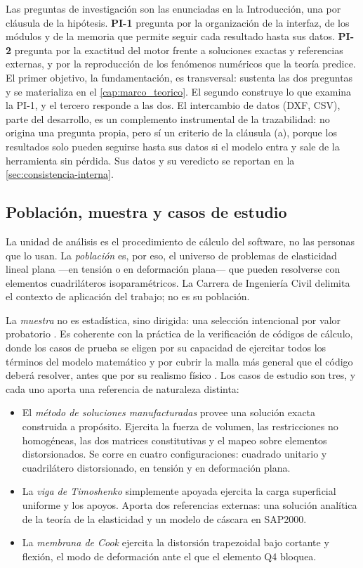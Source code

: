 Las preguntas de investigación son las enunciadas en la Introducción, una por cláusula de la hipótesis. \textbf{PI-1} pregunta por la organización de la interfaz, de los módulos y de la memoria que permite seguir cada resultado hasta sus datos. \textbf{PI-2} pregunta por la exactitud del motor frente a soluciones exactas y referencias externas, y por la reproducción de los fenómenos numéricos que la teoría predice. El primer objetivo, la fundamentación, es transversal: sustenta las dos preguntas y se materializa en el \autoref{cap:marco_teorico}. El segundo construye lo que examina la PI-1, y el tercero responde a las dos. El intercambio de datos (DXF, CSV), parte del desarrollo, es un complemento instrumental de la trazabilidad: no origina una pregunta propia, pero sí un criterio de la cláusula (a), porque los resultados solo pueden seguirse hasta sus datos si el modelo entra y sale de la herramienta sin pérdida. Sus datos y su veredicto se reportan en la \autoref{sec:consistencia-interna}.

\subsection{Población, muestra y casos de estudio}
\label{sec:poblacion}

La unidad de análisis es el procedimiento de cálculo del software, no las personas que lo usan. La \emph{población} es, por eso, el universo de problemas de elasticidad lineal plana —en tensión o en deformación plana— que pueden resolverse con elementos cuadriláteros isoparamétricos. La Carrera de Ingeniería Civil delimita el contexto de aplicación del trabajo; no es su población.

La \emph{muestra} no es estadística, sino dirigida: una selección intencional por valor probatorio \autocite[p.~215]{sampieri2018metodologia}. Es coherente con la práctica de la verificación de códigos de cálculo, donde los casos de prueba se eligen por su capacidad de ejercitar todos los términos del modelo matemático y por cubrir la malla más general que el código deberá resolver, antes que por su realismo físico \autocite[pp.~190, 208]{oberkampf2010vv}. Los casos de estudio son tres, y cada uno aporta una referencia de naturaleza distinta:

\begin{itemize}
    \item El \emph{método de soluciones manufacturadas} provee una solución exacta construida a propósito. Ejercita la fuerza de volumen, las restricciones no homogéneas, las dos matrices constitutivas y el mapeo sobre elementos distorsionados. Se corre en cuatro configuraciones: cuadrado unitario y cuadrilátero distorsionado, en tensión y en deformación plana.
    \item La \emph{viga de Timoshenko} simplemente apoyada ejercita la carga superficial uniforme y los apoyos. Aporta dos referencias externas: una solución analítica de la teoría de la elasticidad y un modelo de cáscara en SAP2000.
    \item La \emph{membrana de Cook} ejercita la distorsión trapezoidal bajo cortante y flexión, el modo de deformación ante el que el elemento Q4 bloquea.
\end{itemize}

